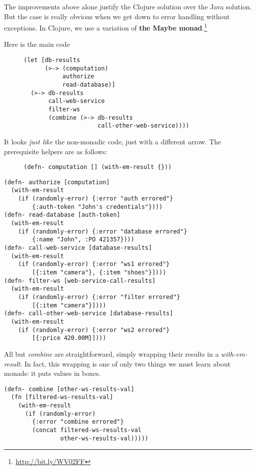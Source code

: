\documentclass[11pt]{article}
\begin{document}
The improvements above alone justify the Clojure solution over the
Java solution. But the case is really obvious when we get down to
error handling without exceptions. In Clojure, we use a variation
of \textbf{the Maybe monad}.\footnote{\url{http://bit.ly/WV02FF}}

Here is the main code

\begin{figure}[H]
\label{monadic-main}
\begin{verbatim}
(let [db-results
      (>-> (computation)
           authorize
           read-database)]
  (>-> db-results
       call-web-service
       filter-ws
       (combine (>-> db-results
                     call-other-web-service))))
\end{verbatim}
\end{figure}

It looks \emph{just like} the non-monadic code, just with a different
arrow. The prerequisite helpers are as follows:

\begin{figure}[H]
\label{monadic-helpers}
\begin{verbatim}
(defn- computation [] (with-em-result {}))
\end{verbatim}
\end{figure}
\begin{verbatim}
(defn- authorize [computation]
  (with-em-result
    (if (randomly-error) {:error "auth errored"}
        {:auth-token "John's credentials"})))
(defn- read-database [auth-token]
  (with-em-result
    (if (randomly-error) {:error "database errored"}
        {:name "John", :PO 421357})))
(defn- call-web-service [database-results]
  (with-em-result
    (if (randomly-error) {:error "ws1 errored"}
        [{:item "camera"}, {:item "shoes"}])))
(defn- filter-ws [web-service-call-results]
  (with-em-result
    (if (randomly-error) {:error "filter errored"}
        [{:item "camera"}])))
(defn- call-other-web-service [database-results]
  (with-em-result
    (if (randomly-error) {:error "ws2 errored"}
        [{:price 420.00M}])))
\end{verbatim}

All but \emph{combine} are straightforward, simply wrapping their
results in a \emph{with-em-result}. In fact, this wrapping is one of
only two things we must learn about monads: it puts values in
boxes. 

\begin{verbatim}
(defn- combine [other-ws-results-val]
  (fn [filtered-ws-results-val]
    (with-em-result
      (if (randomly-error)
        {:error "combine errored"}
        (concat filtered-ws-results-val
                other-ws-results-val)))))
\end{verbatim}
\end{document}
